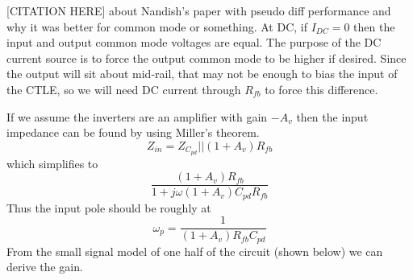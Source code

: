 [CITATION HERE] about Nandish's paper with pseudo diff performance and why it was better for common mode or something.
At DC, if $I_{DC}=0$ then the input and output common mode voltages are equal. The purpose of the DC current source is to force the output common mode to be higher if desired. Since the output will sit about mid-rail, that may not be enough to bias the input of the CTLE, so we will need DC current through $R_{fb}$ to force this difference.

If we assume the inverters are an amplifier with gain $-A_v$ then the input impedance can be found by using Miller's theorem. 
\begin{equation}
\label{TIA input impedance}
Z_{in}=Z_{C_{pd}}||(1+A_v)R_{fb}
\end{equation}
which simplifies to 
\begin{equation}
\label{TIA input impedance}
\frac{(1+A_v)R_{fb}}{1+j\omega (1+A_v)C_{pd}R_{fb}}
\end{equation}
Thus the input pole should be roughly at
\begin{equation}
\label{TIA input pole}
\omega_p=\frac{1}{(1+A_v)R_{fb}C_{pd}}
\end{equation}
From the small signal model of one half of the circuit (shown below) we can derive the gain.

